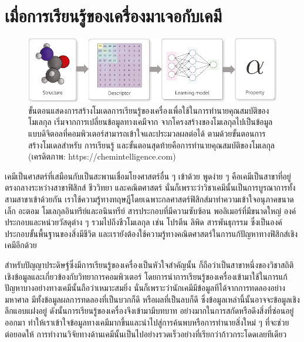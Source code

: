\section{เมื่อการเรียนรู้ของเครื่องมาเจอกับเคมี}
\label{sec:ml_meets_chem}

\begin{figure}[H]
    \centering
    \includegraphics[width=\linewidth]{fig/workflow_chem_ml.png}
    \caption{ขั้นตอนแสดงการสร้างโมเดลการเรียนรู้ของเครื่องเพื่อใช้ในการทำนายคุณสมบัติของโมเลกุล เริ่มจากการเปลี่ยนข้อมูลทางเคมีจาก%
    จากโครงสร้างของโมเลกุลไปเป็นข้อมูลแบบดิจิตอลที่คอมพิวเตอร์สามารถเข้าใจและประมวลผลต่อได้ ตามด้วยขั้นตอนการสร้างโมเดลสำหรับ%
    การเรียนรู้ และขั้นตอนสุดท้ายคือการทำนายคุณสมบัติของโมเลกุล (เครดิตภาพ: https://chemintelligence.com)}
    \label{fig:workflow_chem_ml}
\end{figure}

เคมีเป็นศาสตร์ที่เสมือนกับเป็นสะพานเชื่อมโยงศาสตร์อื่น ๆ เข้าด้วย พูดง่าย ๆ คือเคมีเป็นสาขาที่อยู่ตรงกลางระหว่างสาขาฟิสิกส์ ชีววิทยา และคณิตศาสตร์
นั่นก็เพราะว่าวิชาเคมีนั้นเป็นการบูรณาการทั้งสามสาขาเข้าด้วยกัน เราใช้ความรู้ทางทฤษฎีโดยเฉพาะกลศาสตร์ฟิสิกส์มาทำความเข้าใจอนุภาคขนาดเล็ก 
อะตอม โมเลกุลอินทรีย์และอนินทรีย์ สารประกอบที่มีความซับซ้อน พอลิเมอร์ที่มีขนาดใหญ่ องค์ประกอบและหน่วยวัสดุต่าง ๆ รวมไปถึงชีวโมเลกุล เช่น 
โปรตีน ลิพิด สารพันธุกรรม ซึ่งเป็นองค์ประกอบขั้นพื้นฐานของสิ่งมีชีวิต และเรายังต้องใช้ความรู้ทางคณิตศาสตร์ในการแก้ปัญหาทางฟิสิกส์เชิงเคมีอีกด้วย

สำหรับปัญญาประดิษฐ์ซึ่งมีการเรียนรู้ของเครื่องเป็นหัวใจสำคัญนั้น ก็ถือว่าเป็นสาขาหนึ่งของวิชาสถิติเชิงข้อมูลและเกี่ยวข้องกับวิทยาการคอมพิวเตอร์
โดยการนำการเรียนรู้ของเครื่องเข้ามาใช้ในการแก้ปัญหาบางอย่างทางเคมีนั้นถือว่าเหมาะสมยิ่ง นั่นก็เพราะว่านักเคมีมีข้อมูลทีได้จากการทดลองอย่างมหาศาล
มีทั้งข้อมูลผลการทดลองที่เป็นบวกก็ดี หรือผลที่เป็นลบก็ดี ซึ่งข้อมูลเหล่านี้นั้นอาจจะข้อมูลเชิงลึกแอบแฝงอยู่ ดังนั้นการเรียนรู้ของเครื่องจึงเข้ามามีบทบาท%
อย่างมากในการสกัดหรือดึงสิ่งที่ซ่อนอยู่ออกมา ทำให้เราเข้าใจข้อมูลทางเคมีมากขึ้นและนำไปสู่การค้นพบหรือการทำนายสิ่งใหม่ ๆ ที่จะช่วยต่อยอดให้%
การทำงานวิจัยทางด้านเคมีนั้นเป็นไปอย่างรวดเร็วอย่างที่เรียกว่าก้าวกระโดดเลยทีเดียว\autocite{cartwright2020,zotero-817}

